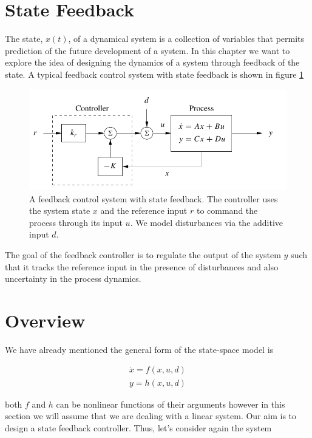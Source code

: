\section{State Feedback}
\label{state_feedback}

The state, $x(t)$, of a dynamical system is a collection of variables that permits prediction
of the future development of a system. In this chapter we want to  explore the idea of designing
the dynamics of a system through feedback of the state.  A typical feedback control system with state feedback
is shown in figure \ref{state_feedback_sys}

\begin{figure}[!htb]
\begin{center}
\includegraphics[scale=0.280]{img/state_feedback/state_feedback_sys.jpeg}
\end{center}
\caption{A feedback control system with state feedback. The controller uses the system
state $x$ and the reference input $r$ to command the process through its input $u$. We model
disturbances via the additive input $d$.}
\label{state_feedback_sys}
\end{figure}


The goal of the feedback controller is to regulate the output of the system $y$ such that it tracks the reference input in the presence of disturbances and also uncertainty in the process dynamics.

\section{Overview}
We have already mentioned the general form of the state-space model is 

\begin{eqnarray}
\dot{x} = f(x, u, d) \\
y = h(x,u,d)
\end{eqnarray}

both $f$ and $h$ can be nonlinear functions of their arguments however in this section we will assume that we are dealing with a linear system. Our aim is
to design a state feedback controller. Thus, let's consider again the system

